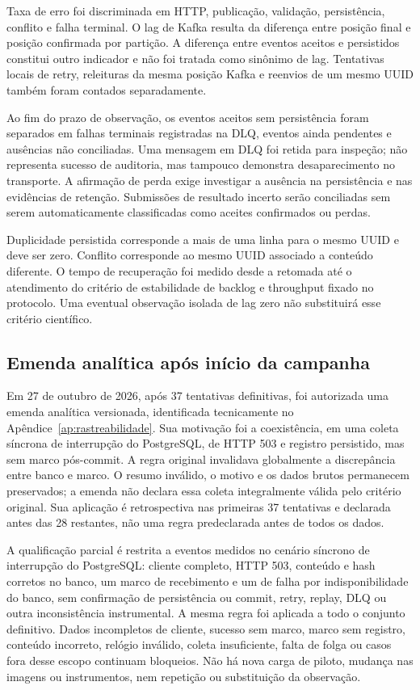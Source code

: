 Taxa de erro foi discriminada em HTTP, publicação, validação, persistência, conflito e falha terminal. O lag de Kafka resulta da diferença entre posição final e posição confirmada por partição. A diferença entre eventos aceitos e persistidos constitui outro indicador e não foi tratada como sinônimo de lag. Tentativas locais de retry, releituras da mesma posição Kafka e reenvios de um mesmo UUID também foram contados separadamente.

Ao fim do prazo de observação, os eventos aceitos sem persistência foram separados em falhas terminais registradas na DLQ, eventos ainda pendentes e ausências não conciliadas. Uma mensagem em DLQ foi retida para inspeção; não representa sucesso de auditoria, mas tampouco demonstra desaparecimento no transporte. A afirmação de perda exige investigar a ausência na persistência e nas evidências de retenção. Submissões de resultado incerto serão conciliadas sem serem automaticamente classificadas como aceites confirmados ou perdas.

Duplicidade persistida corresponde a mais de uma linha para o mesmo UUID e deve ser zero. Conflito corresponde ao mesmo UUID associado a conteúdo diferente. O tempo de recuperação foi medido desde a retomada até o atendimento do critério de estabilidade de backlog e throughput fixado no protocolo. Uma eventual observação isolada de lag zero não substituirá esse critério científico.

\subsection{Emenda analítica após início da campanha}
Em 27 de outubro de 2026, após 37 tentativas definitivas, foi autorizada uma emenda analítica versionada, identificada tecnicamente no Apêndice~\ref{ap:rastreabilidade}. Sua motivação foi a coexistência, em uma coleta síncrona de interrupção do PostgreSQL, de HTTP 503 e registro persistido, mas sem marco pós-commit. A regra original invalidava globalmente a discrepância entre banco e marco. O resumo inválido, o motivo e os dados brutos permanecem preservados; a emenda não declara essa coleta integralmente válida pelo critério original. Sua aplicação é retrospectiva nas primeiras 37 tentativas e declarada antes das 28 restantes, não uma regra predeclarada antes de todos os dados.

A qualificação parcial é restrita a eventos medidos no cenário síncrono de interrupção do PostgreSQL: cliente completo, HTTP 503, conteúdo e hash corretos no banco, um marco de recebimento e um de falha por indisponibilidade do banco, sem confirmação de persistência ou commit, retry, replay, DLQ ou outra inconsistência instrumental. A mesma regra foi aplicada a todo o conjunto definitivo. Dados incompletos de cliente, sucesso sem marco, marco sem registro, conteúdo incorreto, relógio inválido, coleta insuficiente, falta de folga ou casos fora desse escopo continuam bloqueios. Não há nova carga de piloto, mudança nas imagens ou instrumentos, nem repetição ou substituição da observação.

